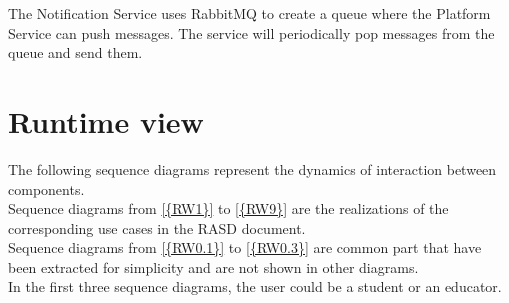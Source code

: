 The Notification Service uses RabbitMQ to create a queue where the Platform Service can push messages.
The service will periodically pop messages from the queue and send them.

\pagebreak

\section{Runtime view}
The following sequence diagrams represent the dynamics of interaction between components.\\
Sequence diagrams from \ref{{RW1}} to \ref{{RW9}} are the realizations of the corresponding use cases in the RASD document.\\
Sequence diagrams from \ref{{RW0.1}} to \ref{{RW0.3}} are common part that have been extracted for simplicity and are not shown in other diagrams.\\
In the first three sequence diagrams, the user could be a student or an educator.

